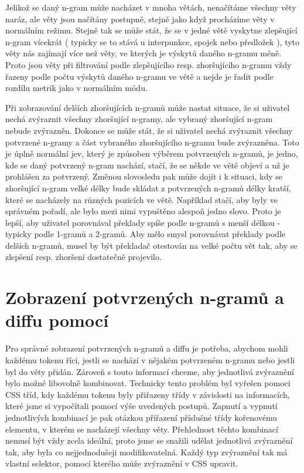 Jelikož se daný \mbox{n-gram} může nacházet v mnoha větách,
  nenačítáme všechny věty naráz,
  ale věty jsou načítány postupně,
  stejně jako když procházíme věty v normálním režimu.
Stejně tak se může stát,
  že se v jedné větě vyskytne zlepšující \mbox{n-gram} vícekrát
  ( typicky se to stává u interpunkce, spojek nebo předložek ),
  tyto věty nás zajímají více než věty,
  ve kterých je výskytů daného \mbox{n-gramu} méně.
Proto jsou věty při filtrování podle zlepšujícího resp. zhoršujícího \mbox{n-gramu} vždy řazeny podle počtu výskytů daného \mbox{n-gramu} ve větě
  a nejde je řadit podle rozdílu metrik jako v normálním módu.

Při zobrazování delších zhoršujících \mbox{n-gramů} může nastat situace,
  že si uživatel nechá zvýraznit všechny zhoršující \mbox{n-gramy},
  ale vybraný zhoršující \mbox{n-gram} nebude zvýrazněn.
Dokonce se může stát, 
  že si uživatel nechá zvýraznit všechny potvrzené \mbox{n-gramy}
  a část vybraného zhoršujícího \mbox{n-gramu} bude zvýrazněna.
Toto je úplně normální jev,
  který je způsoben výběrem potvrzených \mbox{n-gramů},
  je jedno, kde se daný potvrzený \mbox{n-gram} nachází,
  stačí,
  že se někde ve větě objeví a už je prohlášen za potvrzený.
Změnou slovosledu pak může dojít i k situaci,
  kdy se zhoršující \mbox{n-gram} velké délky bude skládat z potvrzených \mbox{n-gramů} délky kratší,
  které se nacházely na různých pozicích ve větě. 
Například stačí, aby byly ve správném pořadí,
  ale bylo mezi nimi vypuštěno alespoň jedno slovo.
Proto je lepší,
  aby uživatel porovnával překlady spíše podle \mbox{n-gramů} s menší délkou -
  typicky podle 1-gramů a 2-gramů.
Aby mělo smysl porovnávat překlady podle delších \mbox{n-gramů},
  musel by být překladač otestován na velké počtu vět tak,
  aby se zlepšení resp. zhoršení dostatečně projevilo.

\section{Zobrazení potvrzených \mbox{n-gramů} a diffu pomocí}
Pro správné zobrazení potvrzených \mbox{n-gramů} a diffu je potřeba,
  abychom mohli každému tokenu říci,
  jestli se nachází v nějakém potvrzeném \mbox{n-gramu} nebo jestli byl do věty přidán.
Zároveň s touto informací chceme,
  aby jednotlivá zvýraznění bylo možné libovolně kombinovat.
Technicky tento problém byl vyřešen pomoci CSS tříd,
  kdy každému tokenu byly přiřazeny třídy v závislosti na informacích,
  které jsme si vypočítali pomocí výše uvedených postupů.
Zapnutí a vypnutí jednotlivých kombinací je pak otázkou přiřazení příslušné třídy kořenovému elementu,
  v kterém se nacházejí všechny věty.
Přehlednost těchto kombinací nemusí být vždy zcela ideální, 
  proto jsme se snažili udělat jednotlivá zvýraznění tak,
  aby byla co nejjednodušeji modifikovatelná.
Každý typ zvýraznění tak má vlastní selektor,
  pomocí kterého může zvýraznění v CSS upravit.

